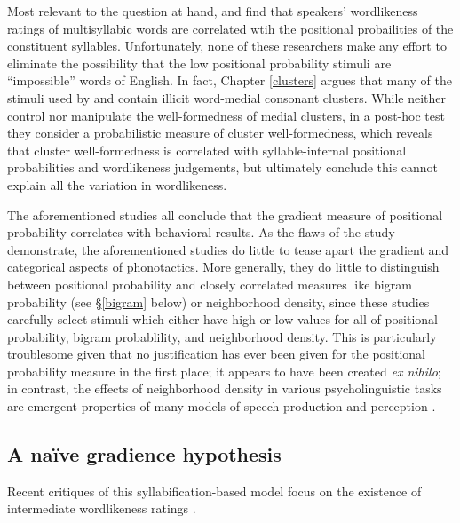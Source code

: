 Most relevant to the question at hand, \citet{Frisch2000} and \citet{Vitevitch1997} find that speakers' wordlikeness ratings of multisyllabic words are correlated wtih the positional probailities of the constituent syllables. Unfortunately, none of these researchers make any effort to eliminate the possibility that the low positional probability stimuli are ``impossible'' words of English. In fact, 
Chapter \ref{clusters} argues
that many of the stimuli used by \citeauthor{Frisch2000} and \citeauthor{Vitevitch1997} contain illicit word-medial consonant clusters. While \citeauthor{Vitevitch1997} neither control nor manipulate the well-formedness of medial clusters, in a post-hoc test they consider a probabilistic measure of cluster well-formedness, which reveals that cluster well-formedness is correlated with syllable-internal positional probabilities and wordlikeness judgements, but \citeauthor{Vitevitch1997} ultimately conclude this cannot explain all the variation in wordlikeness. 

The aforementioned studies all conclude that the gradient measure of positional probability correlates with behavioral results. As the flaws of the \citet{Vitevitch1997} study demonstrate, the aforementioned studies do little to tease apart the gradient and categorical aspects of phonotactics. More generally, they do little to distinguish between positional probability and closely correlated measures like bigram probability (see \S\ref{bigram} below) or neighborhood density, since these studies carefully select stimuli which either have high or low values for all of positional probability, bigram probablility, and neighborhood density. This is particularly troublesome given that no justification has ever been given for the positional probability measure in the first place; it appears to have been created \emph{ex nihilo}; in contrast, the effects of neighborhood density in various psycholinguistic tasks are emergent properties of many models of speech production \citep[e.g.,][]{Luce1998,Luce2000} and perception \citep{Marslen-Wilson1984,Marslen-Wilson1987,McClelland1986,Norris1994,Norris2000}. 

\subsection{A naïve gradience hypothesis}

Recent critiques of this syllabification-based model focus on the existence of intermediate wordlikeness ratings \citep[see also][]{Coleman1997,Anttila2008a}.


